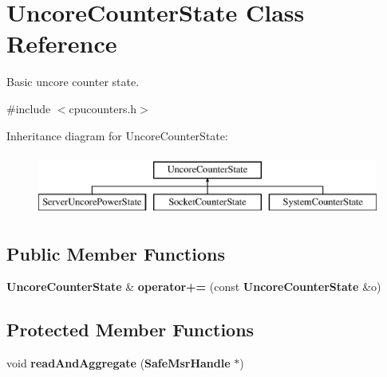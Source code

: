 \section{Uncore\+Counter\+State Class Reference}
\label{classUncoreCounterState}


Basic uncore counter state.  




{\ttfamily \#include $<$cpucounters.\+h$>$}

Inheritance diagram for Uncore\+Counter\+State\+:\begin{figure}[H]
\begin{center}
\leavevmode
\includegraphics[height=2.000000cm]{classUncoreCounterState}
\end{center}
\end{figure}
\subsection*{Public Member Functions}
\begin{DoxyCompactItemize}
\item 
{\bf Uncore\+Counter\+State} \& {\bfseries operator+=} (const {\bf Uncore\+Counter\+State} \&o)\label{classUncoreCounterState_a96eb270d92f202a85ed11ded8cf60f71}

\end{DoxyCompactItemize}
\subsection*{Protected Member Functions}
\begin{DoxyCompactItemize}
\item 
void {\bfseries read\+And\+Aggregate} ({\bf Safe\+Msr\+Handle} $\ast$)\label{classUncoreCounterState_a7c3a2c7c2aab86c21a7a216fac3cf092}

\end{DoxyCompactItemize}
